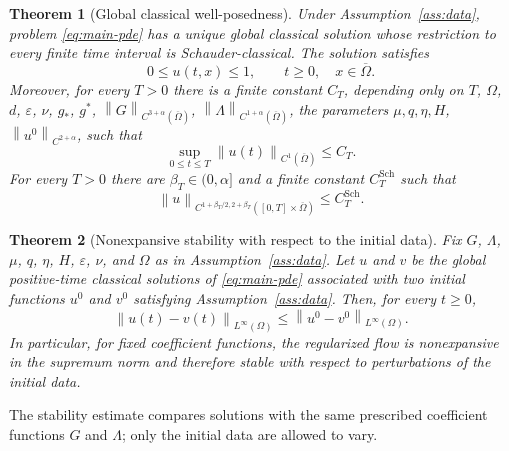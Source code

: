 \documentclass[11pt]{article}
\newtheorem{theorem}{Theorem}[section]
\theoremstyle{remark}
\newcommand{\eps}{\varepsilon}
\newcommand{\nupar}{\nu}
\newcommand{\norm}[1]{\left\lVert #1\right\rVert}
\begin{document}
\begin{theorem}[Global classical well-posedness]\label{thm:global}
Under Assumption~\ref{ass:data}, problem \eqref{eq:main-pde} has a unique global classical solution whose restriction to every finite time interval is Schauder-classical. The solution satisfies
\begin{equation}\label{eq:range}
        0\le u(t,x)\le1,
        \qquad t\ge0,
        \quad x\in\overline\Omega.
\end{equation}
Moreover, for every $T>0$ there is a finite constant $C_T$, depending only on $T$, $\Omega$, $d$, $\eps$, $\nupar$, $g_*$, $g^*$, $\norm{G}_{C^{3+\alpha}(\overline\Omega)}$, $\norm{\Lambda}_{C^{1+\alpha}(\overline\Omega)}$, the parameters $\mu,q,\eta,H$, $\norm{u^0}_{C^{2+\alpha}}$, such that
\begin{equation}\label{eq:finite-time-c1}
        \sup_{0\le t\le T}\norm{u(t)}_{C^1(\overline\Omega)}\le C_T.
\end{equation}
For every $T>0$ there are $\beta_T\in(0,\alpha]$ and a finite constant $C_T^{\mathrm{Sch}}$ such that
\begin{equation}\label{eq:positive-holder}
        \norm{u}_{C^{1+\beta_T/2,2+\beta_T}([0,T]\times\overline\Omega)}
        \le C_T^{\mathrm{Sch}}.
\end{equation}
\end{theorem}

\begin{theorem}[Nonexpansive stability with respect to the initial data]
\label{thm:stability}
Fix $G$, $\Lambda$, $\mu$, $q$, $\eta$, $H$, $\eps$, $\nupar$, and $\Omega$
as in Assumption~\ref{ass:data}. Let $u$ and $v$ be the global
positive-time classical solutions of \eqref{eq:main-pde} associated with
two initial functions $u^0$ and $v^0$ satisfying
Assumption~\ref{ass:data}. Then, for every $t\geq 0$,
\begin{equation}\label{eq:stability}
    \norm{u(t)-v(t)}_{L^\infty(\Omega)}
    \leq
    \norm{u^0-v^0}_{L^\infty(\Omega)}.
\end{equation}
In particular, for fixed coefficient functions, the regularized flow is
nonexpansive in the supremum norm and therefore stable with respect to
perturbations of the initial data.
\end{theorem}






The stability estimate compares solutions with the same prescribed coefficient functions $G$ and $\Lambda$; only the initial data are allowed to vary.
\end{document}
